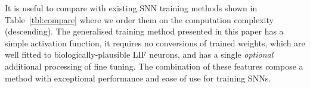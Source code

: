 \documentclass[10pt,journal,compsoc]{IEEEtran}
\begin{document}
	
	It is useful to compare with existing SNN training methods shown in Table~\ref{tbl:compare} where we order them on the computation complexity (descending).
	The generalised training method presented in this paper has a simple activation function, it requires no conversions of trained weights, which are well fitted to biologically-plausible LIF neurons, and has a single \emph{optional} additional processing of fine tuning.
	The combination of these features compose a method with exceptional performance and ease of use for training SNNs.
	
\end{document}
